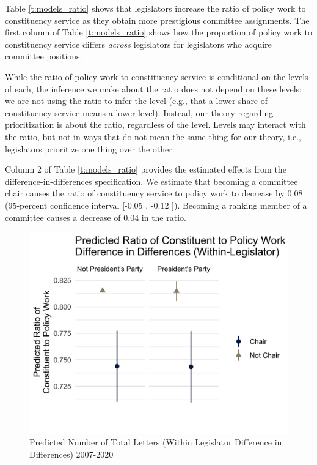 \documentclass[12pt]{article}
\begin{document}
Table \ref{t:models_ratio} shows that legislators increase the ratio of policy work to constituency service as they obtain more 
prestigious committee assignments. The first column of Table \ref{t:models_ratio} shows how the proportion of policy work to constituency service differs \textit{across} legislators
for legislators who acquire committee positions. 

While the ratio of policy work to constituency service is conditional on the levels of each, the inference we make about the ratio does not depend on these levels; we are not using the ratio to infer the level (e.g., that a lower share of constituency service means a lower level). Instead, our theory regarding prioritization is about the ratio, regardless of the level. Levels may interact with the ratio, but not in ways that do not mean the same thing for our theory, i.e., legislators prioritize one thing over the other. 

Column 2 of Table \ref{t:models_ratio} provides the estimated effects from the difference-in-differences specification.
We estimate that becoming a committee chair causes the ratio of constituency service to policy work to decrease by 0.08 (95-percent confidence interval [-0.05 , -0.12 ]). Becoming a ranking member of a committee causes a decrease of 0.04 in the ratio.

\begin{figure}[hbt!]
\centering
\caption{Predicted Number of Total Letters (Within Legislator Difference in Differences) 2007-2020} \label{f:m-ratio-predicted}
\includegraphics[width = .8\textwidth]{figs/m-ratio-predicted-3}
\end{figure}
\end{document}
